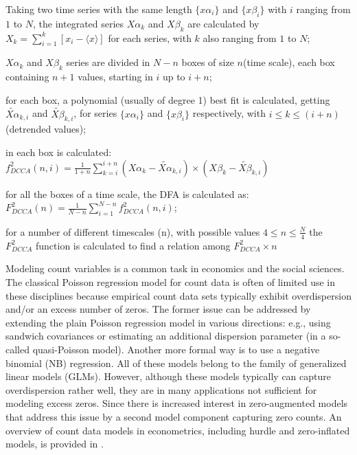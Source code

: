 \documentclass[article]{jss}
\begin{document}
\begin{description}
  \label{steps:DCCA}
  \item Taking two time series with the same length \(\{x\alpha_{i}\}\) and \(\{x\beta_{i}\}\) with \(i\) ranging from \(1\) to \(N\),
        the integrated series \(X\alpha_{k}\) and \(X\beta_{k}\) are calculated by
        \(X_{k} = \sum_{i=1}^{k}\left[x_{i} - \langle x \rangle \right] \) for each series, with \(k\) also ranging from \(1\) to \(N\);
  \item \(X\alpha_{k}\) and \(X\beta_{k}\) series are divided in \(N - n\) boxes of size \(n\)(time scale),
        each box containing \(n + 1\) values, starting in \(i\) up to \(i + n\);
  \item for each box, a polynomial (usually of degree 1) best fit is calculated, getting
        \(\widetilde{X\alpha}_{k, i}\) and \(\widetilde{X\beta}_{k, i}\),
        for series \(\{x\alpha_{i}\}\) and \(\{x\beta_{i}\}\) respectively,
        with \( i \le k \le (i + n) \) (detrended values);
  \item in each box is calculated: \(f_{DCCA}^{2}(n, i) =
        \frac{1}{1+n} \sum_{k=i}^{i + n}(X\alpha_{k}-\widetilde{X\alpha}_{k, i}) \times (X\beta_{k}-\widetilde{X\beta}_{k, i})\)
  \item for all the boxes of a time scale, the DFA is calculated as:\\[10pt]
        \(F_{DCCA}^{2}(n) =\frac{1}{N - n} \sum_{i=1}^{N-n} f_{DCCA}^{2}(n, i)\);
  \item for a number of different timescales (n), with possible values
        \( 4 \le n \le \frac{N}{4}\) the \(F_{DCCA}^{2}\) function is calculated to find a relation among
        \(F_{DCCA}^{2} \times n\)
\end{description}




Modeling count variables is a common task in economics and the social sciences.
The classical Poisson regression model for count data is often of limited use in
these disciplines because empirical count data sets typically exhibit
overdispersion and/or an excess number of zeros. The former issue can be
addressed by extending  the plain Poisson regression model in various
directions: e.g., using sandwich covariances or estimating an additional
dispersion parameter (in a so-called quasi-Poisson model). Another more formal
way is to use a negative binomial (NB) regression. All of these models belong to
the family of generalized linear models (GLMs). However, although these models
typically can capture overdispersion rather well, they are in many applications
not sufficient for  modeling excess zeros. Since \cite{Mullahy:1986} there is
increased interest in zero-augmented models that address this issue by a second
model component capturing zero counts. An overview of count data models in
econometrics, including  hurdle and zero-inflated models, is provided in
\cite{Cameron+Trivedi:2013}.
\end{document}
